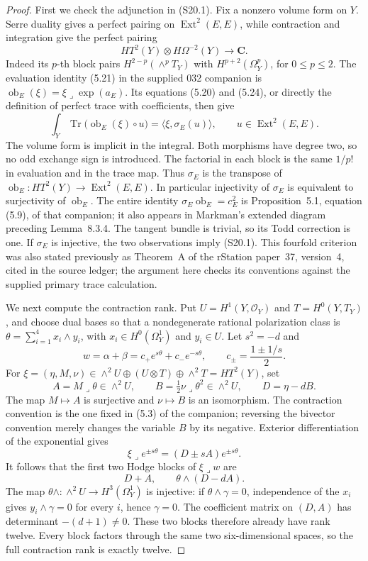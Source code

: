 \documentclass[11pt,a4paper]{article}
\theoremstyle{definition}
\begin{document}
\begin{proof}
First we check the adjunction in (S20.1). Fix a nonzero volume
form on $Y$. Serre duality gives a perfect pairing on
$\operatorname{Ext}^2(E,E)$, while contraction and integration
give the perfect pairing
\[
 HT^2(Y)\otimes H\Omega^{-2}(Y)\longrightarrow\mathbf C.
\]
Indeed its $p$-th block pairs
$H^{2-p}(\wedge^pT_Y)$ with $H^{p+2}(\Omega_Y^p)$,
for $0\le p\le2$.
The evaluation identity (5.21) in the supplied 032 companion
is $\operatorname{ob}_E(\xi)=\xi\mathbin{\lrcorner}
\exp(a_E)$. Its equations (5.20) and (5.24), or directly the
definition of perfect trace with coefficients, then give
\[
 \int_Y\operatorname{Tr}
       \bigl(\operatorname{ob}_E(\xi)\circ u\bigr)
   =\langle\xi,\sigma_E(u)\rangle,
 \qquad u\in\operatorname{Ext}^2(E,E).
\]
The volume form is implicit in the integral. Both morphisms
have degree two, so no odd exchange sign is introduced.
The factorial in each block is the same $1/p!$ in evaluation
and in the trace map. Thus $\sigma_E$ is the transpose of
$\operatorname{ob}_E:HT^2(Y)\to\operatorname{Ext}^2(E,E)$.
In particular injectivity of $\sigma_E$ is equivalent to
surjectivity of $\operatorname{ob}_E$.
The entire identity
$\sigma_E\operatorname{ob}_E=c_E^2$ is Proposition~5.1,
equation (5.9), of that companion; it also appears in Markman's
extended diagram preceding Lemma~8.3.4. The tangent bundle
is trivial, so its Todd correction is one.
If $\sigma_E$ is injective, the two observations imply
(S20.1). This fourfold criterion was also stated previously
as Theorem~A of the rStation paper~37, version~4, cited in the
source ledger; the argument here checks its conventions
against the supplied primary trace calculation.

We next compute the contraction rank. Put
$U=H^1(Y,\mathcal O_Y)$ and $T=H^0(Y,T_Y)$, and choose
dual bases so that a nondegenerate rational polarization
class is $\theta=\sum_{i=1}^4 x_i\wedge y_i$, with
$x_i\in H^0(\Omega_Y^1)$ and $y_i\in U$.
Let $s^2=-d$ and
\[
 w=\alpha+\beta
   =c_+e^{s\theta}+c_-e^{-s\theta},
 \qquad c_\pm=\frac{1\pm1/s}{2}.
\]
For
$\xi=(\eta,M,\nu)\in\wedge^2U\oplus(U\otimes T)
\oplus\wedge^2T=HT^2(Y)$, set
\[
 A=M\mathbin{\lrcorner}\theta\in\wedge^2U,
 \qquad B=\tfrac12\nu\mathbin{\lrcorner}\theta^2
             \in\wedge^2U,
 \qquad D=\eta-dB.
\]
The map $M\mapsto A$ is surjective and $\nu\mapsto B$ is
an isomorphism. The contraction convention is the one fixed
in (5.3) of the companion; reversing the bivector convention
merely changes the variable $B$ by its negative.
Exterior differentiation of the exponential gives
\[
 \xi\mathbin{\lrcorner}e^{\pm s\theta}
      =(D\pm sA)e^{\pm s\theta}.
\]
It follows that the first two Hodge blocks of
$\xi\mathbin{\lrcorner}w$ are
\[
 D+A,\qquad\theta\wedge(D-dA).
\]
The map $\theta\wedge:\wedge^2U\to H^3(\Omega_Y^1)$
is injective: if $\theta\wedge\gamma=0$, independence of
the $x_i$ gives $y_i\wedge\gamma=0$ for every $i$, hence
$\gamma=0$. The coefficient matrix on $(D,A)$ has
determinant $-(d+1)\ne0$. These two blocks therefore already
have rank twelve. Every block factors through the same two
six-dimensional spaces, so the full contraction rank is
exactly twelve.


\end{proof}
\end{document}
